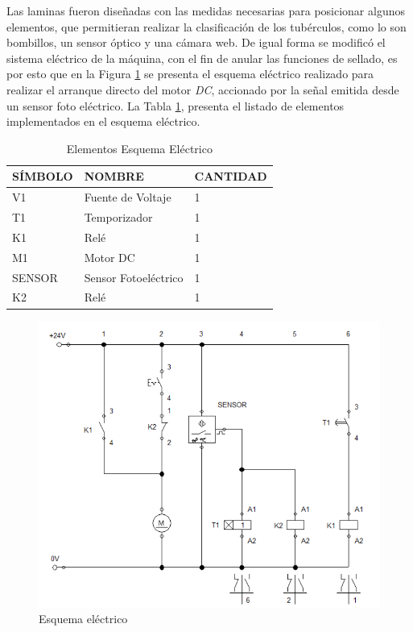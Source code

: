 Las laminas fueron diseñadas con las medidas necesarias para posicionar algunos elementos, que permitieran realizar la clasificación de los tubérculos, como lo son bombillos, un sensor óptico y una cámara web. De igual forma se modificó el sistema eléctrico de la máquina, con el fin de anular las funciones de sellado, es por esto que en la Figura \ref{fig:Esquema} se presenta el esquema eléctrico realizado para realizar el arranque directo del motor \textit{DC}, accionado por la señal emitida desde un sensor foto eléctrico. La Tabla \ref{table:esquema}, presenta el listado de elementos implementados en el esquema eléctrico.
 
 \begin{table}[ht]
 	\centering
 	
 	\begin{tabular}{|p{2cm}|p{5cm}|p{3cm}|}
 		\hline
 		SÍMBOLO & NOMBRE & CANTIDAD \\ 
 		\hline
 		V1 & Fuente de Voltaje & 1 \\
 		\hline
 		T1 & Temporizador & 1 \\
 		\hline
 		K1 & Relé & 1 \\
 		\hline
 		M1 & Motor DC & 1 \\
 		\hline
 		SENSOR & Sensor Fotoeléctrico & 1 \\
 		\hline
 		K2 & Relé & 1 \\
 		\hline
 	\end{tabular}
 	\caption{Elementos Esquema Eléctrico}
 	\label{table:esquema}
 \end{table}	
 
\newpage
\begin{figure}[ht]
	\centering
	\includegraphics[scale=0.5]{Figs/66.png}
	\caption{Esquema eléctrico}
	\label{fig:Esquema}
\end{figure}



